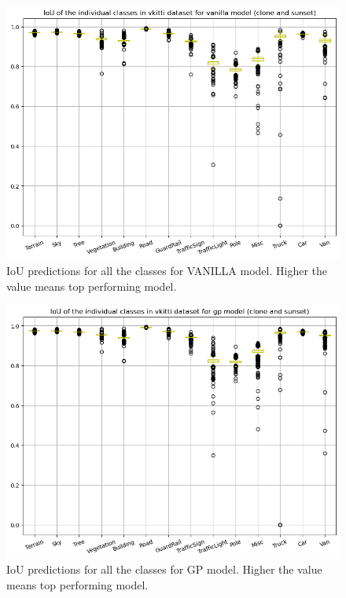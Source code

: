 		

	\begin{figure}
		\centering
		\includegraphics[width=13cm]{images/IoU_vanilla_two_class.png}
		\caption{IoU predictions for all the classes for VANILLA model. Higher the value means top performing model.}
		\label{fig:performance_metric_three_classes}
	\end{figure}

	\begin{figure}
		\centering
		\includegraphics[width=13cm]{images/IoU_gp_two_class.png}
		\caption{IoU predictions for all the classes for GP model. Higher the value means top performing model.}
		\label{fig:performance_metric_three_classes}
	\end{figure}

